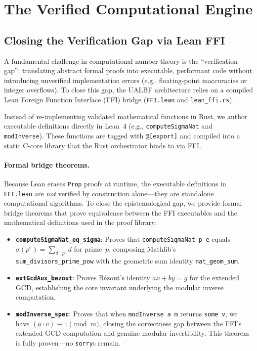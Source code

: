 \section{The Verified Computational Engine}
\label{sec:computational_methodology}

\subsection{Closing the Verification Gap via Lean FFI}
\label{subsec:lean_ffi}

A fundamental challenge in computational number theory is the
``verification gap'': translating abstract formal proofs into
executable, performant code without introducing unverified
implementation errors (e.g., floating-point inaccuracies or integer
overflows).  To close this gap, the UALBF architecture relies on a
compiled Lean Foreign Function Interface (FFI) bridge
(\texttt{FFI.lean} and \texttt{lean\_\allowbreak{}ffi.rs}).

Instead of re-implementing validated mathematical functions in Rust, we
author executable definitions directly in Lean~4 (e.g.,
\texttt{computeSigmaNat} and \texttt{modInverse}).
These functions are tagged with \texttt{@[export]} and compiled into a
static C-core library that the Rust orchestrator binds to via FFI\@.

\paragraph{Formal bridge theorems.}
Because Lean erases \texttt{Prop} proofs at runtime, the executable
definitions in \texttt{FFI.lean} are \emph{not} verified by
construction alone---they are standalone computational algorithms.
To close the epistemological gap, we provide formal bridge theorems
that prove equivalence between the FFI executables and the mathematical
definitions used in the proof library:

\begin{itemize}
  \item \textbf{\texttt{computeSigmaNat\_eq\_sigma}}: Proves that
    \texttt{computeSigmaNat~p~e} equals
    $\sigma(p^e) = \sum_{d \mid p^e} d$ for prime~$p$, composing
    Mathlib's \texttt{sum\_divisors\_prime\_pow} with the geometric sum
    identity \texttt{nat\_geom\_sum}.
  \item \textbf{\texttt{extGcdAux\_bezout}}: Proves B\'ezout's identity
    $a x + b y = g$ for the extended GCD, establishing the core invariant
    underlying the modular inverse computation.
  \item \textbf{\texttt{modInverse\_spec}}: Proves that when
    \texttt{modInverse a m} returns \texttt{some~v}, we have
    $(a \cdot v) \equiv 1 \pmod{m}$, closing the correctness gap between
    the FFI's extended-GCD computation and genuine modular invertibility.
    This theorem is fully proven---no \texttt{sorry}s remain.
\end{itemize}

